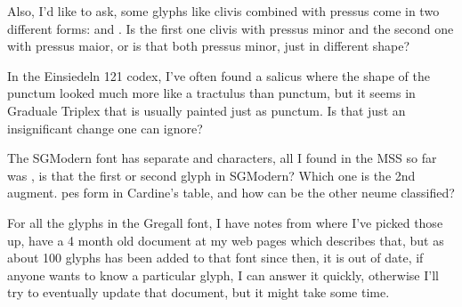 \documentclass[a4paper]{article}
\begin{document}
Also, I'd like to ask, some glyphs like clivis combined with pressus come
in two different forms:
\quad{}\quad and
\quad{}\quad.  Is the first one clivis with
pressus minor and the second one with pressus maior, or is that both pressus
minor, just in different shape?

In the Einsiedeln 121 codex, I've often found a salicus where the shape of
the punctum looked much more like a tractulus than punctum, but it seems
in Graduale Triplex that is usually painted just as punctum.  Is that just
an insignificant change one can ignore?

The SGModern font has separate {\fontsize{16}{16}\color{red}\GreGallModern{}}\quad and \quad
characters, all I found in the MSS so far was \quad, is that
the first or second glyph in SGModern?  Which one is the 2nd augment. pes form in
Cardine's table, and how can be the other neume classified?

For all the glyphs in the Gregall font, I have notes from where I've picked
those up, have a 4 month old document at my web pages which describes that,
but as about 100 glyphs has been added to that font since then, it is out of
date, if anyone wants to know a particular glyph, I can answer it quickly,
otherwise I'll try to eventually update that document, but it might take
some time.
\end{document}
